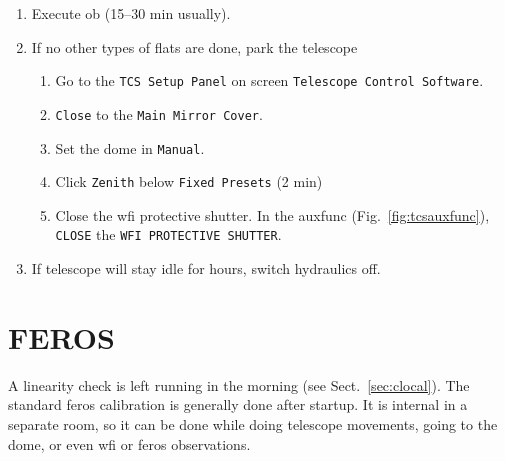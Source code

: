 \documentclass[11pt,fleqn]{book} %
\makeatletter
\def\menu#1#2{\texttt{#1}\ifx{}#2\else\@for\@x:=#2\do{$\rightarrow$\texttt{\@x}}\fi}
\def\wmenu#1#2{window menu \menu{#1}{#2}}
\makeatother
\begin{document}
\begin{enumerate}
\begin{enumerate}
\begin{enumerate}
                 \item Use \wmenu{Interface}{Engineering}.
                 \item Middle-click the filter name, fill in value, and type enter.\\
                       Name is \texttt{ESONNN\_name/width} (\texttt{NNN}: number, \texttt{name}: filtre name or wavelength)\\
                       In virtual desktop \texttt{WFI ICS}, a filter list is found below \texttt{SETUP Instrument}
                 \item Deactivate the filtres you don't want.\\
                       Right-click the triangles to get a thumb down
              \end{enumerate}       
     \end{enumerate}
     \item Execute \gls{ob} (15--30 min usually).
     \item If no other types of flats are done, park the telescope 
     \begin{enumerate}
         \item Go to the \texttt{TCS Setup Panel} on screen \texttt{Telescope Control Software}.
         \item \texttt{Close} to the \texttt{Main Mirror Cover}.
         \item Set the dome in \texttt{Manual}.
         \item Click \texttt{Zenith} below \texttt{Fixed Presets} (2 min)
         \item Close the \gls{wfi} protective shutter.
           In the \gls{auxfunc} (Fig.~\ref{fig:tcsauxfunc}), \texttt{CLOSE} the \texttt{WFI PROTECTIVE SHUTTER}.
     \end{enumerate}
     \item If telescope will stay idle for hours, switch hydraulics off.
   \end{enumerate}



\section{FEROS}

A linearity check is left running in the morning (see Sect.~\ref{sec:clocal}). The standard \gls{feros} calibration is generally done after startup.  It is internal in a separate room, so it can be done while doing telescope movements, going to the dome, or even \gls{wfi} or \gls{feros} observations.
\end{document}
